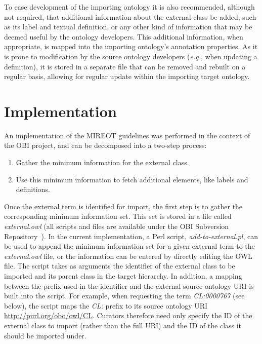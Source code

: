 \documentclass[jou]{ao2e}%
\begin{document}
To ease development of the importing ontology it is also recommended, although not required, that additional information about the external class be added, such as its label and textual definition, or any other kind of information that may be deemed useful by the ontology developers.
This additional information, when appropriate, is mapped into the importing ontology's annotation properties. As it is prone to modification by the source ontology developers (\textit{e.g.}, when updating a definition), it is stored in a separate file that can be removed and rebuilt on a regular basis, allowing for regular update within the importing target ontology. %


\section{Implementation}

An implementation of the \ac{MIREOT} guidelines was performed in the context of the \ac{OBI} project, and can be decomposed into a two-step process:

\begin{enumerate}
\item Gather the minimum information for the external class.
\item Use this minimum information to fetch additional elements, like labels and definitions.
\end{enumerate}

Once the external term is identified for import, the first step is to gather the corresponding minimum information set.
This set is stored in a file called \emph{external.owl} (all scripts and files are available under the \ac{OBI} Subversion Repository~\citep{OBIScripts}).
In the current implementation, a Perl script, \emph{add-to-external.pl}, can be used to append the minimum information set for a given external term to the \emph{external.owl} file, or the information can be entered by directly editing the OWL file. %
The script takes as arguments the identifier of the external class to be imported and its parent class in the target hierarchy.
In addition, a mapping between the prefix used in the identifier and the external source ontology URI is built into the script. For example, when requesting the term \textit{CL:0000767} (see below), the script maps the \textit{CL:} prefix to its source ontology URI \url{http://purl.org/obo/owl/CL}.
Curators therefore need only specify the ID of the external class to import (rather than the full URI) and the ID of the class it should be imported under.
\end{document}
